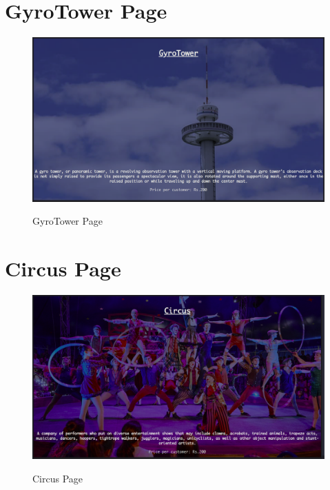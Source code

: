 \section{GyroTower Page}
\begin{figure}[H]
\centering
\caption{GyroTower Page}
\includegraphics[scale=.22]{./drp.png}
\\[0.2in]
\label{fig:GyroTower Page}
\end{figure}

\thispagestyle{fancy}

\section{Circus Page}
\begin{figure}[H]
\centering
\caption{Circus Page}
\includegraphics[scale=.22]{./crc.png}
\\[0.2in]
\label{fig:Circus Page}
\end{figure}

\thispagestyle{fancy}
